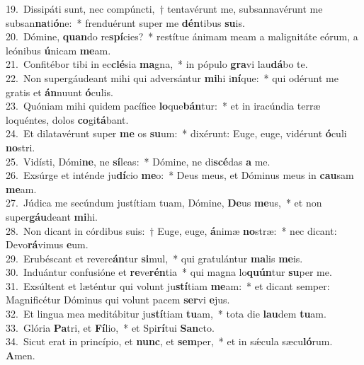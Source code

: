 {19.~}Dissipáti sunt, nec compúncti,~† tentavérunt me, subsannavérunt me subsan\textbf{na}ti\textbf{ó}ne:~* frenduérunt super me \textbf{dén}tibus \textbf{su}is.\\
{20.~}Dómine, \textbf{quan}do re\textbf{spí}cies?~* restítue ánimam meam a malignitáte eórum, a leónibus \textbf{ú}nicam \textbf{me}am.\\
{21.~}Confitébor tibi in ec\textbf{clé}sia \textbf{ma}gna,~* in pópulo \textbf{gra}vi lau\textbf{dá}bo te.\\
{22.~}Non supergáudeant mihi qui adversántur \textbf{mi}hi i\textbf{ní}que:~* qui odérunt me gratis et \textbf{án}nuunt \textbf{ó}culis.\\
{23.~}Quóniam mihi quidem pacífice \textbf{lo}que\textbf{bán}tur:~* et in iracúndia terræ loquéntes, dolos \textbf{co}gi\textbf{tá}bant.\\
{24.~}Et dilatavérunt super \textbf{me} os \textbf{su}um:~* dixérunt: Euge, euge, vidérunt \textbf{ó}culi \textbf{no}stri.\\
{25.~}Vidísti, Dómi\textbf{ne}, ne \textbf{sí}leas:~* Dómine, ne di\textbf{scé}das \textbf{a} me.\\
{26.~}Exsúrge et inténde ju\textbf{dí}cio \textbf{me}o:~* Deus meus, et Dóminus meus in \textbf{cau}sam \textbf{me}am.\\
{27.~}Júdica me secúndum justítiam tuam, Dómine, \textbf{De}us \textbf{me}us,~* et non super\textbf{gáu}deant \textbf{mi}hi.\\
{28.~}Non dicant in córdibus suis:~† Euge, euge, \textbf{á}nimæ \textbf{no}stræ:~* nec dicant: Devo\textbf{rá}vimus \textbf{e}um.\\
{29.~}Erubéscant et revere\textbf{án}tur \textbf{si}mul,~* qui gratulántur \textbf{ma}lis \textbf{me}is.\\
{30.~}Induántur confusióne et \textbf{re}ve\textbf{rén}tia~* qui magna lo\textbf{quún}tur \textbf{su}per me.\\
{31.~}Exsúltent et læténtur qui volunt ju\textbf{stí}tiam \textbf{me}am:~* et dicant semper: Magnificétur Dóminus qui volunt pacem \textbf{ser}vi \textbf{e}jus.\\
{32.~}Et lingua mea meditábitur ju\textbf{stí}tiam \textbf{tu}am,~* tota die \textbf{lau}dem \textbf{tu}am.\\
{33.~}Glória \textbf{Pa}tri, et \textbf{Fí}lio,~* et Spi\textbf{rí}tui \textbf{San}cto.\\
{34.~}Sicut erat in princípio, et \textbf{nunc}, et \textbf{sem}per,~* et in sǽcula sæcu\textbf{ló}rum. \textbf{A}men.\\
